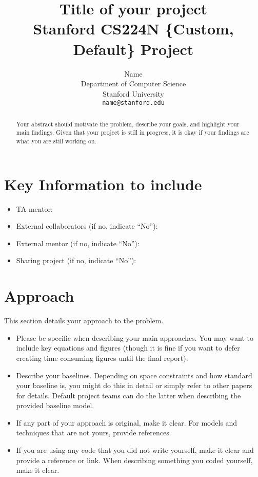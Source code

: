 \documentclass{article}
\title{
  Title of your project \\
  \vspace{1em}
  \small{\normalfont Stanford CS224N \{Custom, Default\} Project}  %
}
\author{
  Name \\
  Department of Computer Science \\
  Stanford University \\
  \texttt{name@stanford.edu} \\
}
\begin{document}
\maketitle

\begin{abstract}
  Your abstract should motivate the problem, describe your goals, and highlight your main findings. Given that your project is still in progress, it is okay if your findings are what you are still working on.
\end{abstract}


\section{Key Information to include}
\begin{itemize}
    \item TA mentor:
    \item External collaborators (if no, indicate ``No''):
    \item External mentor (if no, indicate ``No''):
    \item Sharing project (if no, indicate ``No''):
\end{itemize}


\section{Approach}
This section details your approach to the problem. 
\begin{itemize}
    \item Please be specific when describing your main approaches. You may want to include key equations and figures (though it is fine if you want to defer creating time-consuming figures until the final report).
    \item Describe your baselines. Depending on space constraints and how standard your baseline is, you might do this in detail or simply refer to other papers for details. Default project teams can do the latter when describing the provided baseline model.
    \item If any part of your approach is original, make it clear. For models and techniques that are not yours, provide references.
    \item If you are using any code that you did not write yourself, make it clear and provide a reference or link. 
    When describing something you coded yourself, make it clear.
\end{itemize} 
\end{document}
